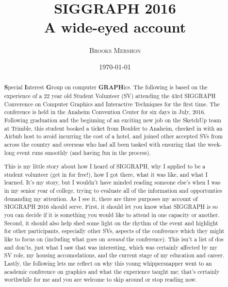 \documentclass[a4paper, 11pt]{article} %
\title{\textbf{SIGGRAPH 2016}\\ %
A wide-eyed account} %
\author{\textsc{Brooks Mershon}} %
\date{\today} %
\begin{document}
\maketitle %

\eject


\renewcommand{\abstractname}{Forward} %

\begin{abstract}
	\textbf{S}pecial \textbf{I}nterest \textbf{G}roup on computer \textbf{GRAPH}ics. The following is based on the experience of a 22 year old Student Volunteer (SV) attending the 43rd SIGGRAPH Converence on Computer Graphics and Interactive Techniques for the first time. The conference is held in the Anaheim Convention Center for six days in July, 2016. Following graduation and the beginning of an exciting new job on the SketchUp team at Trimble, this student booked a ticket from Boulder to Anaheim, checked in with an Airbnb host to avoid incurring the cost of a hotel, and joined other accepted SVs from across the country and overseas who had all been tasked with ensuring that the week-long event runs smoothly (and having fun in the process).
	
	This is my little story about how I heard of SIGGRAPH, why I applied to be a student volunteer (get in for free!), how I got there, what it was like, and what I learned. It's my story, but I wouldn't have minded reading someone else's when I was in my senior year of college, trying to evaluate all of the information and opportunties demanding my attention. As I see it, there are three purposes my account of SIGGRAPH 2016 should serve. First, it should let you know what SIGGRAPH is so you can decide if it is something you would like to attend in one capacity or another. Second, it should also help shed some light on the rhythm of the event and highlight for other participants, especially other SVs, aspects of the conference which they might like to focus on (including what goes on \textit{around} the conference). This isn't a list of dos and don'ts, just what I saw that was interesting, which was certainly affected by my SV role, my housing accomodations, and the current stage of my education and career. Lastly, the following lets me reflect on why this young whippersnapper went to an academic conference on graphics and what the experience taught me; that's certainly worthwhile for me and you are welcome to skip around or stop reading now.
\end{abstract}
\end{document}
